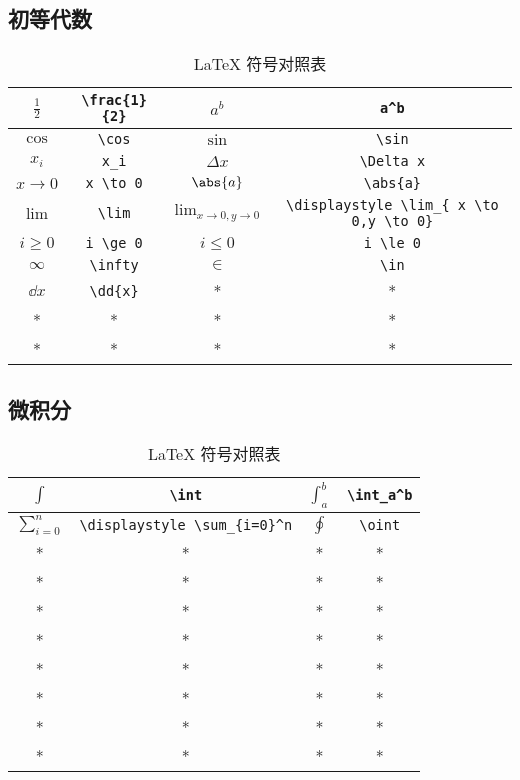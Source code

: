 

\begin{issues}
\issueDraft
\end{issues}

\subsection{初等代数}
\begin{table}[ht]
\centering
\caption{LaTeX 符号对照表}\label{tab_TeXSym0}
\begin{tabular}{|c|c|c|c|}
\hline
$\frac{1}{2}$ & \verb|\frac{1}{2}| & $a^b$ & \verb|a^b| \\
\hline
$\cos$ & \verb|\cos| & $\sin$ & \verb|\sin| \\
\hline
$x_i$ & \verb|x_i| & $\Delta x$& \verb|\Delta x| \\
\hline
$x \to 0$ & \verb|x \to 0| & $\abs{a}$ & \verb|\abs{a}| \\
\hline
$\lim$ & \verb|\lim| & $\displaystyle \lim_{ x \to 0,y \to 0}$ & \verb|\displaystyle \lim_{ x \to 0,y \to 0}| \\
\hline
$i \ge 0$& \verb|i \ge 0| & $i \le 0$ & \verb|i \le 0| \\
\hline
$\infty$ & \verb|\infty| & $\in$ & \verb|\in| \\
\hline
$\dd{x}$ & \verb|\dd{x}| & * & * \\
\hline
* & * & * & * \\
\hline
* & * & * & * \\
\hline
\end{tabular}
\end{table}


\subsection{微积分}
\begin{table}[ht]
\centering
\caption{LaTeX 符号对照表}\label{tab_TeXSym1}
\begin{tabular}{|c|c|c|c|}
\hline
$\int$ & \verb|\int| & $\int_a^b$ & \verb|\int_a^b| \\
\hline
$\displaystyle \sum_{i=0}^n$ & \verb|\displaystyle \sum_{i=0}^n| & $\oint$ & \verb|\oint| \\
\hline
* & * & * & * \\
\hline
* & * & * & * \\
\hline
* & * & * & * \\
\hline
* & * & * & * \\
\hline
* & * & * & * \\
\hline
* & * & * & * \\
\hline
* & * & * & * \\
\hline
* & * & * & * \\
\hline
\end{tabular}
\end{table}
